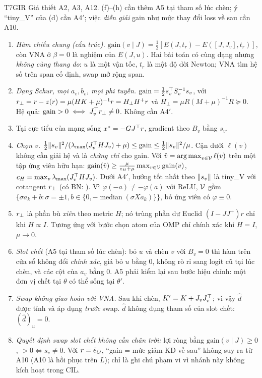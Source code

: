 \begin{namedthm}{T7}{GIR}
Giả thiết A2, A3, A12. (f)--(h) cần thêm A5 tại tham số lúc chèn; ý ``tiny\_V'' của (d) cần A4$'$; việc \emph{diễn giải} gain như mức thay đổi loss về sau cần A10.
\begin{enumerate}[label=(\alph*)]
\item \emph{Hàm chiếu chung (cấu trúc).} $\mathrm{gain}(v\mid J)=\tfrac12[E(J,t_r)-E([J,J_v],t_r)]$, còn VNA ở $\beta=0$ là nghiệm của $E(J,u)$. Hai bài toán có cùng dạng nhưng \emph{không cùng thang đo}: $u$ là một vận tốc, $t_r$ là một độ dời Newton; VNA tìm hệ số trên span cố định, swap mở rộng span.
\item \emph{Dạng Schur, mọi $a_v,b_v$, mọi phi tuyến.} $\mathrm{gain}=\tfrac12s_v^{\top} S_v^{-1}s_v$, với $r_{\perp}=r-z(r)=\mu(HK+\mu)^{-1}r=H_\perp H^+r$ và $H_\perp=\mu R(M+\mu)^{-1}R\succeq0$. Hệ quả: $\mathrm{gain}>0\iff J_v^{\top}r_{\perp}\ne0$. Không cần A4$'$.
\item Tại cực tiểu của mạng sống $x^*=-GJ^{\top} r$, gradient theo $B_v$ bằng $s_v$.
\item \emph{Chọn $v$.} $\tfrac12\lVert s_v\rVert^2/(\lambda_{\max}(J_v^{\top} HJ_v)+\mu)\le\mathrm{gain}\le\tfrac12\lVert s_v\rVert^2/\mu$. Cận dưới $\ell(v)$ không cần giải hệ và là \emph{chứng chỉ} cho gain. Với $\hat v=\operatorname*{arg\,max}_{v\in\mathcal{V}}\ell(v)$ trên một tập ứng viên hữu hạn: $\mathrm{gain}(\hat v)\ge\frac{\mu}{c_H+\mu}\max_{v\in\mathcal{V}}\mathrm{gain}(v)$, $c_H=\max_v\lambda_{\max}(J_v^{\top} HJ_v)$. Dưới A4$'$, hướng tốt nhất theo $\lVert s_v\rVert$ là tiny\_V với cotangent $r_{\perp}$ (có BN: ). Vì $\varphi(-a)\ne-\varphi(a)$ với ReLU, $\mathcal{V}$ gồm $\{\sigma a_k+b:\sigma=\pm1,b\in\{0,-\operatorname{median}(\sigma Xa_k)\}\}$, bỏ ứng viên có $\varphi\equiv0$.
\item $r_{\perp}$ là phần bù \emph{xiên} theo metric $H$; nó trùng phần dư Euclid $(I-JJ^+)r$ chỉ khi $H\propto I$. Tương ứng với bước chọn atom của OMP chỉ chính xác khi $H=I$, $\mu\to0$.
\item \emph{Slot chết} (A5 tại tham số lúc chèn): bỏ $u$ và chèn $v$ với $B_v=0$ thì hàm trên cửa sổ không đổi \emph{chính xác}, giá bỏ $u$ bằng $0$, không rò rỉ sang logit cũ tại lúc chèn, và các cột của $a_v$ bằng $0$. A5 phải kiểm lại sau bước hiệu chỉnh: một đơn vị chết tại $\theta$ có thể sống tại $\theta'$.
\item \emph{Swap không giao hoán với VNA.} Sau khi chèn, $K'=K+J_vJ_v^{\top}$; vì vậy $\hat d$ được tính và áp dụng \emph{trước} swap. $\hat d$ không đụng tham số của slot chết: $(\hat d)_u=0$.
\item \emph{Quyết định swap slot chết không cần chân trời:} lợi ròng bằng $\mathrm{gain}(v\mid J)\ge0$, $>0\iff s_v\ne0$. Với $r=\tilde e_O$, ``gain = mức giảm KD về sau'' không suy ra từ A10 (A10 là hồi phục trên $L$); chỉ là ghi chú phạm vi vì nhánh này không kích hoạt trong CIL.

\end{enumerate}
\end{namedthm}
